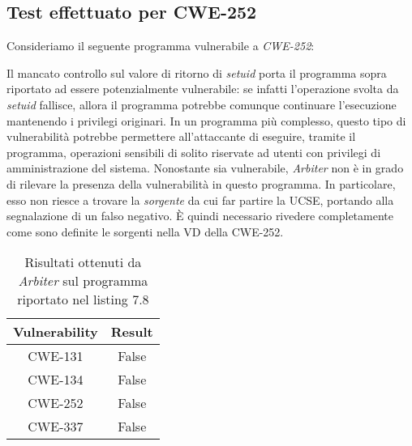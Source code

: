 \documentclass[../main.tex]{subfiles}
\begin{document}
\subsection{Test effettuato per CWE-252}
Consideriamo il seguente programma vulnerabile a \textit{CWE-252}:

Il mancato controllo sul valore di ritorno di \textit{setuid} porta il programma sopra riportato ad essere potenzialmente
vulnerabile: se infatti l'operazione svolta da \textit{setuid} fallisce, allora il programma potrebbe comunque continuare l'esecuzione
mantenendo i privilegi originari. In un programma più complesso, questo tipo di vulnerabilità potrebbe permettere all'attaccante di eseguire, tramite
il programma, operazioni sensibili di solito riservate ad utenti con privilegi di amministrazione del sistema. Nonostante sia vulnerabile, \textit{Arbiter} non è in grado
di rilevare la presenza della vulnerabilità in questo programma. In particolare, esso non riesce a trovare la \textit{sorgente} da cui far partire la UCSE, portando alla segnalazione
di un falso negativo. È quindi necessario rivedere completamente come sono definite le sorgenti nella VD della CWE-252.
\begin{table}[H]
    \centering
    \begin{tabular}{|c|c|}
    \hline
    Vulnerability & Result \\ \hline
    CWE-131       & False   \\ \hline
    CWE-134       & False  \\ \hline
    CWE-252       & False  \\ \hline
    CWE-337       & False  \\ \hline
    \end{tabular}
    \caption{Risultati ottenuti da \textit{Arbiter} sul programma riportato nel listing 7.8}
\end{table}
\end{document}
